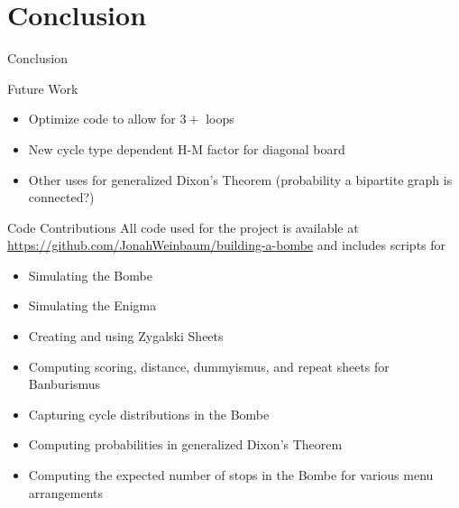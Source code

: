 \documentclass[hyphens,aspectratio=169]{beamer}
\begin{document}
\section{Conclusion}

\begin{frame}[fragile]{}
	\Huge
	\begin{center}
		Conclusion
	\end{center}
\end{frame}

\begin{frame}[fragile]{Future Work}
\begin{itemize}
    \item Optimize code to allow for $3+$ loops
    \pause
    \vspace{1em}
    \item New cycle type dependent H-M factor for diagonal board
    \pause
    \vspace{1em}
    \item Other uses for generalized Dixon's Theorem (probability a bipartite graph is connected?)
\end{itemize}
\end{frame}

\begin{frame}[fragile]{Code Contributions}
All code used for the project is available at \url{https://github.com/JonahWeinbaum/building-a-bombe} and includes scripts for
\begin{itemize}
  \item Simulating the Bombe
  \item Simulating the Enigma
  \item Creating and using Zygalski Sheets
  \item Computing scoring, distance, dummyismus, and repeat sheets
    for Banburismus
  \item Capturing cycle distributions in the Bombe
  \item Computing probabilities in generalized Dixon's Theorem
  \item Computing the expected number of stops in the Bombe for
    various menu arrangements
\end{itemize}
\end{frame}
\end{document}
